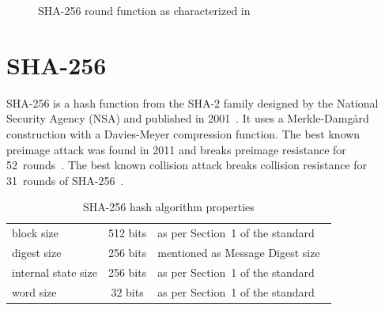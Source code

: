 \begin{figure}[p]
\begin{center}
    \caption{SHA-256 round function as characterized in~\cite{analysisSHA256}}
    \label{fig:sha256-round-function}
  \end{center}
\end{figure}










\section{SHA-256}
\label{sec:dc-sha-256}
%
SHA-256 is a hash function from the SHA-2 family designed by the National Security Agency (NSA)
and published in 2001~\cite{fips-pub-180-4}. It uses a Merkle-Damg\aa{}rd construction
with a Davies-Meyer compression function. The best known preimage attack was found in 2011
and breaks preimage resistance for 52~rounds~\cite{bicliques}. The best known collision attack
breaks collision resistance for 31~rounds of SHA-256~\cite{improving}.
%
\begin{table}[h]
  \begin{center}
    \begin{tabular}{lcl}
      block size           & 512 bits   & as per Section~1 of the standard~\cite{fips-pub-180-4} \\
      digest size          & 256 bits   & mentioned as Message Digest size~\cite{fips-pub-180-4} \\
      internal state size  & 256 bits   & as per Section~1 of the standard~\cite{fips-pub-180-4} \\
      word size            & 32 bits    & as per Section~1 of the standard~\cite{fips-pub-180-4}
    \end{tabular}
    \caption{SHA-256 hash algorithm properties}
    \label{tab:sha256}
  \end{center}
\end{table}

